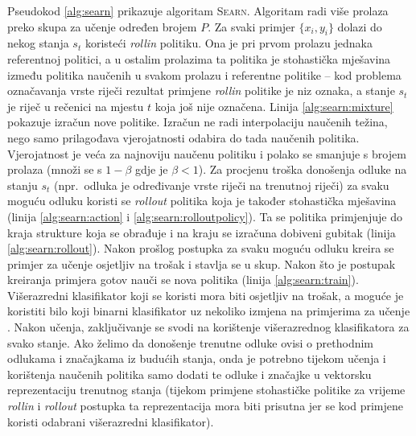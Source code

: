 Pseudokod \ref{alg:searn} prikazuje algoritam \textsc{Searn}. Algoritam radi
više prolaza preko skupa za učenje određen brojem $P$. Za svaki primjer $\{x_i,
y_i\}$ dolazi do nekog stanja $s_t$ koristeći \textit{rollin} politiku. Ona je pri
prvom prolazu jednaka referentnoj politici, a u ostalim prolazima ta politika je
stohastička mješavina između politika naučenih u svakom prolazu i referentne
politike -- kod problema označavanja vrste riječi rezultat primjene
\textit{rollin} politike je niz oznaka, a stanje $s_t$ je riječ u rečenici na
mjestu $t$ koja još nije označena. Linija \ref{alg:searn:mixture} pokazuje
izračun nove politike. Izračun ne radi interpolaciju naučenih težina, nego samo
prilagođava vjerojatnosti odabira do tada naučenih politika. Vjerojatnost je veća
za najnoviju naučenu politiku i polako se smanjuje s brojem prolaza (množi se s
$1-\beta$ gdje je $\beta < 1$). Za procjenu troška donošenja odluke na stanju
$s_t$ (npr.~odluka je određivanje vrste riječi na trenutnoj riječi) za svaku
moguću odluku koristi se \textit{rollout} politika koja je također stohastička
mješavina (linija \ref{alg:searn:action} i \ref{alg:searn:rolloutpolicy}). Ta se
politika primjenjuje do kraja strukture koja se obrađuje i na kraju se izračuna
dobiveni gubitak (linija \ref{alg:searn:rollout}). Nakon prošlog postupka za
svaku moguću odluku kreira se primjer za učenje osjetljiv na trošak i stavlja se
u skup. Nakon što je postupak kreiranja primjera gotov nauči se nova politika
(linija \ref{alg:searn:train}). Višerazredni klasifikator koji se koristi mora
biti osjetljiv na trošak, a moguće je koristiti bilo koji binarni klasifikator
uz nekoliko izmjena na primjerima za učenje \citep{zadrozny2003cost,
beygelzimer2005weighted, beygelzimer2005error}. Nakon učenja, zaključivanje se
svodi na korištenje višerazrednog klasifikatora za svako stanje. Ako želimo da
donošenje trenutne odluke ovisi o prethodnim odlukama i značajkama iz budućih
stanja, onda je potrebno tijekom učenja i korištenja naučenih politika samo dodati
te odluke i značajke u vektorsku reprezentaciju trenutnog stanja (tijekom
primjene stohastičke politike za vrijeme \textit{rollin} i \textit{rollout}
postupka ta reprezentacija mora biti prisutna jer se kod primjene koristi
odabrani višerazredni klasifikator).

